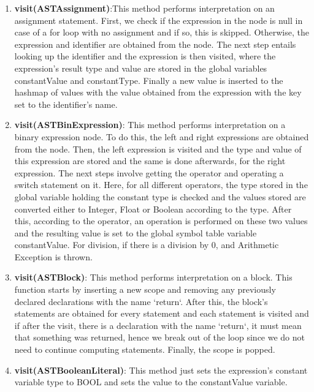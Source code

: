 \documentclass{article}
\begin{document}
			\begin{enumerate}

					\item \textbf{visit(ASTAssignment)}:This method performs interpretation on an assignment statement. First, we check if the expression in the node is null in case of a for loop with no assignment and if so, this is skipped. Otherwise, the expression and identifier are obtained from the node. The next step entails looking up the identifier and the expression is then visited, where the expression's result type and value are stored in the global variables constantValue and constantType.  Finally a new value is inserted to the hashmap of values with the value obtained from the expression with the key set to the identifier's name.
			
					\item \textbf{visit(ASTBinExpression)}: This method performs interpretation on a binary expression node. To do this, the left and right expressions are obtained from the node. Then, the left expression is visited and the type and value of this expression are stored and the same is done afterwards,  for the right expression. The next steps involve getting the operator and operating a switch statement on it. Here, for all different operators, the type stored in the global variable holding the constant type is checked and the values stored are converted either to Integer, Float or Boolean according to the type. After this, according to the operator, an operation is performed on these two values and the resulting value is set to the global symbol table variable constantValue. For division, if there is a division by 0, and Arithmetic Exception is thrown.
			
					\item \textbf{visit(ASTBlock)}: This method performs interpretation on a block. This function starts by inserting a new scope and removing any previously declared declarations with the name `return`. After this, the block's statements are obtained for every statement and each statement is visited and if after the visit, there is a declaration with the name `return`, it must mean that something was returned, hence we break out of the loop since we do not need to continue computing statements. Finally, the scope is popped.
			
					\item \textbf{visit(ASTBooleanLiteral)}: This method just sets the expression's constant variable type to BOOL and sets the value to the constantValue variable.
	

\end{enumerate}
\end{document}
